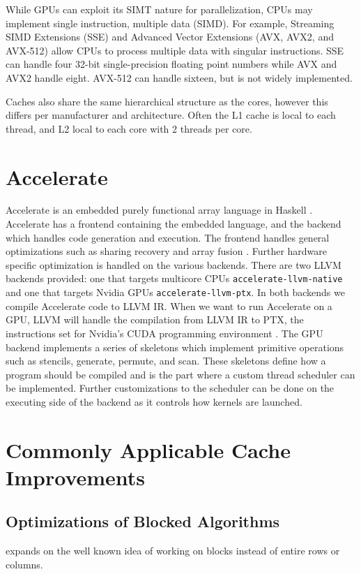 While GPUs can exploit its SIMT nature for parallelization, CPUs may implement single instruction, multiple data (SIMD). For example, Streaming SIMD Extensions (SSE) and Advanced Vector Extensions (AVX, AVX2, and AVX-512) allow CPUs to process multiple data with singular instructions.
SSE can handle four 32-bit single-precision floating point numbers while AVX and AVX2 handle eight.
AVX-512 can handle sixteen, but is not widely implemented.

Caches also share the same hierarchical structure as the cores, however this differs per manufacturer and architecture.
Often the L1 cache is local to each thread, and L2 local to each core with 2 threads per core.

\section{Accelerate}
\label{sec:accelerate}
Accelerate is an embedded purely functional array language in Haskell \cite{chakravarty2011accelerating}.
Accelerate has a frontend containing the embedded language, and the backend which handles code generation and execution.
The frontend handles general optimizations such as sharing recovery and array fusion \cite{mcdonell2013optimising,balen2020optimal}.
Further hardware specific optimization is handled on the various backends.
There are two LLVM \cite{llvm} backends provided: one that targets multicore CPUs \texttt{accelerate-llvm-native} and one that targets Nvidia GPUs \texttt{accelerate-llvm-ptx}.
In both backends we compile Accelerate code to LLVM IR.
When we want to run Accelerate on a GPU, LLVM will handle the compilation from LLVM IR to PTX, the instructions set for Nvidia's CUDA programming environment \cite{mcdonell2015type, llvm, nvidia2021cudadocs}.
The GPU backend implements a series of skeletons which implement primitive operations such as stencils, generate, permute, and scan.
These skeletons define how a program should be compiled and is the part where a custom thread scheduler can be implemented.
Further customizations to the scheduler can be done on the executing side of the backend as it controls how kernels are launched.

\section{Commonly Applicable Cache Improvements}

\subsection{Optimizations of Blocked Algorithms}
\label{sec:optimization_blocked}
\citet{lam1991cache} expands on the well known idea of working on blocks instead of entire rows or columns.

